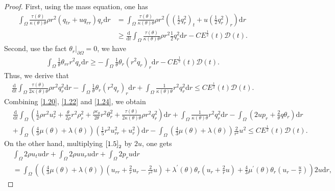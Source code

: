 \documentclass[11pt,reqno]{amsart}
\numberwithin{equation}{section}
\newcommand{\dif}{\mathrm{d}}
\begin{document}
\begin{proof}
 First, using the mass equation, one has
 \begin{align*}
  \int_{\Omega} \frac{\tau(\theta)}{\kappa(\theta)\theta} \rho r^2 ( q_{tr}+u q_{rr}) q_r\dif r&= \int_{\Omega} \frac{\tau(\theta)}{\kappa(\theta)\theta} \rho r^2 ( (\frac{1}{2} q_r^2)_t+u (\frac{1}{2}q_r^2)_r) \dif r\\
  &\ge \frac{\dif}{\dif t} \int_{\Omega} \frac{\tau(\theta)}{\kappa(\theta)\theta} \rho r^2  \frac{1}{2} q_r^2 \dif r -CE^\frac{1}{2}(t) \mathcal D(t).
  \end{align*}
 Second, use the fact $\theta_r|_{\partial \Omega}=0$, we have
 \begin{align*}
 \int_{\Omega} \frac{1}{\theta} \theta_{rr} r^2 q_r \dif r \ge -\int_{\Omega} \frac{1}{\theta} \theta_r (r^2 q_r)_r\dif r -CE^\frac{1}{2}(t) \mathcal D(t).
 \end{align*}
 Thus, we derive that
 \begin{align}\label{1.24}
 \frac{\dif}{\dif t} \int_{\Omega} \frac{\tau(\theta)}{2\kappa(\theta)\theta} \rho r^2 q_r^2 \dif r -\int_{\Omega} \frac{1}{\theta} \theta_r (r^2 q_r)_r \dif r+\int_{\Omega} \frac{1}{\kappa(\theta)\theta} r^2 q_r^2 \dif r \le CE^\frac{1}{2}(t) \mathcal D(t).
 \end{align}
 Combining \eqref{1.20}, \eqref{1.22} and \eqref{1.24}, we obtain{\small
 \begin{align}
& \frac{\dif}{\dif t} \int_{\Omega} \left( \frac{1}{2}\rho r^2 u_r^2+\frac{\theta}{2\rho} r^2 \rho_r^2+\frac{\rho e_\theta}{2\theta} r^2 \theta_r^2+\frac{\tau(\theta)}{2\kappa(\theta)\theta} \rho r^2 q_r^2 \right)\dif r
+\int_{\Omega} \frac{1}{\kappa(\theta)\theta} r^2 q_r^2 \dif r -\int_{\Omega}  \left(2 u p_r+\frac{2}{\theta} q\theta_r\right)\dif r \nonumber \\
&+ \int_{\Omega} \left(\frac{4}{3} \mu(\theta)+\lambda(\theta)\right)\left(\frac{1}{5} r^2 u_{rr}^2+u_r^2\right) \dif r-   \int_{\Omega} \left(\frac{4}{3} \mu(\theta)+\lambda(\theta)\right)\frac{2}{r^2} u^2 \le CE^\frac{1}{2}(t) \mathcal D(t). \label{1.25}
 \end{align}}
 On the other hand, multiplying $\eqref{1.5}_2$ by $2u$, one gets{\small
 \begin{align*}
& \int_{\Omega} 2 \rho u_t  u \dif r +\int_{\Omega} 2\rho u u_r  u \dif r+\int_{\Omega}  2 p_r  u \dif r\\
&= \int_{\Omega} \left(\left(\frac{4}{3} \mu(\theta)+\lambda(\theta)\right)\left(u_{rr}+\frac{2}{r}u_r-\frac{2}{r^2} u\right)+\lambda^\prime(\theta)\theta_r\left(u_r+\frac{2}{r}u\right)+\frac{4}{3}\mu^\prime(\theta) \theta_r\left(u_r-\frac{u}{r}\right) \right)2 u \dif r ,

\end{align*}}
\end{proof}
\end{document}
